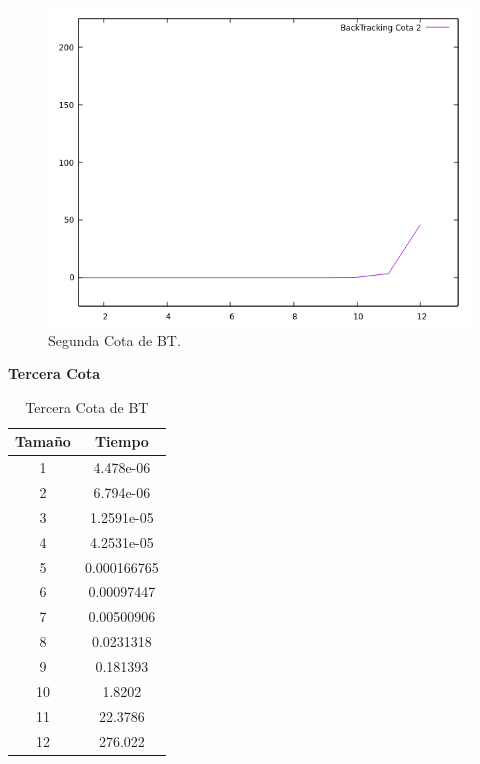 \documentclass[a4paper,12pt,twoside]{article} %
\begin{document}
\begin{figure}[h]
  \begin{center}
  
  	\includegraphics[scale=0.7]{IMAGENES/bt_c2.png}
  	\caption{Segunda Cota de BT.} 
  	
  \end{center}
\end{figure}

\newpage

\textbf{Tercera Cota}
\begin{table}[h]
    \begin{center}
	\begin{tabular}{|c|c|}
		\hline
		Tamaño & Tiempo \\
		\hline
            1 & 4.478e-06 \\
            2 & 6.794e-06 \\
            3 & 1.2591e-05 \\
            4 & 4.2531e-05 \\
            5 & 0.000166765 \\
            6 & 0.00097447 \\
            7 & 0.00500906 \\
            8 & 0.0231318 \\
            9 & 0.181393 \\
            10 & 1.8202 \\
            11 & 22.3786 \\
            12 & 276.022 \\
		\hline
	\end{tabular}
    \end{center}
    \caption{Tercera Cota de BT}
\end{table}
\end{document}
